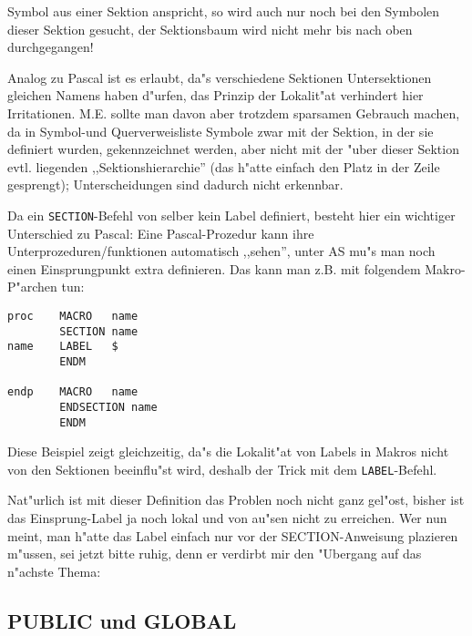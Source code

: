 \documentclass[12pt,a4paper,twoside]{report}
\newcommand{\tty}[1]{{\tt #1}}
\begin{document}
{Symbol aus einer Sektion anspricht, so wird auch nur noch bei den
Symbolen dieser Sektion gesucht, der Sektionsbaum wird nicht mehr
bis nach oben durchgegangen!
\par
Analog zu Pascal ist es erlaubt, da"s verschiedene Sektionen Untersektionen
gleichen Namens haben d"urfen, das Prinzip der Lokalit"at verhindert hier
Irritationen.  M.E. sollte man davon aber trotzdem sparsamen Gebrauch machen,
da in Symbol-und Querverweisliste Symbole zwar mit der Sektion, in der sie
definiert wurden, gekennzeichnet werden, aber nicht mit der "uber dieser
Sektion evtl. liegenden ,,Sektionshierarchie'' (das h"atte einfach den Platz
in der Zeile gesprengt); Unterscheidungen sind dadurch nicht erkennbar.
\par
Da ein \tty{SECTION}-Befehl von selber kein Label definiert, besteht hier
ein wichtiger Unterschied zu Pascal: Eine Pascal-Prozedur kann
ihre Unterprozeduren/funktionen automatisch ,,sehen'', unter AS mu"s man
noch einen Einsprungpunkt extra definieren.  Das kann man z.B. mit folgendem
Makro-P"archen tun:
\begin{verbatim}
proc    MACRO   name
        SECTION name
name    LABEL   $
        ENDM

endp    MACRO   name
        ENDSECTION name
        ENDM
\end{verbatim}
Diese Beispiel zeigt gleichzeitig, da"s die Lokalit"at von Labels in
Makros nicht von den Sektionen beeinflu"st wird, deshalb der Trick mit dem
\tty{LABEL}-Befehl.
\par
Nat"urlich ist mit dieser Definition das Problen noch nicht ganz gel"ost,
bisher ist das Einsprung-Label ja noch lokal und von au"sen nicht zu
erreichen.  Wer nun meint, man h"atte das Label einfach nur vor der 
SECTION-Anweisung plazieren m"ussen, sei jetzt bitte ruhig, denn er
verdirbt mir den "Ubergang auf das n"achste Thema:


\subsection{PUBLIC und GLOBAL}

}
\end{document}
